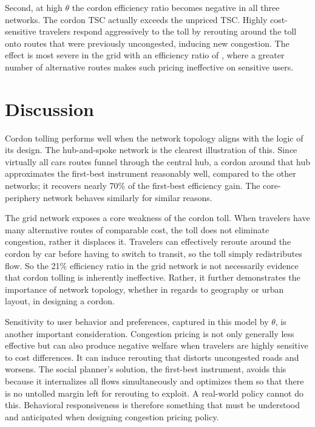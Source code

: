 \documentclass[12pt]{article}
\begin{document}
Second, at high $\theta$ the cordon efficiency ratio becomes negative in all three networks.
The cordon TSC actually exceeds the unpriced TSC.
Highly cost-sensitive travelers respond aggressively to the toll by rerouting around the toll onto routes that were previously uncongested, inducing new congestion.
The effect is most severe in the grid with an efficiency ratio of , where a greater number of alternative routes makes such pricing ineffective on sensitive users.

\begin{table}
    \centering
    \footnotesize
    
    \caption{Equilibrium mode shares under low and high $\theta$.}
    \label{tab:mode_shares_varying_theta}
\end{table}

\begin{table}
    \centering
    \footnotesize
    
    \caption{Total social cost under low and high $\theta$.}
    \label{tab:tsc_varying_theta}
\end{table}

\section{Discussion}

Cordon tolling performs well when the network topology aligns with the logic of its design.
The hub-and-spoke network is the clearest illustration of this.
Since virtually all cars routes funnel through the central hub, a cordon around that hub approximates the first-best instrument reasonably well, compared to the other networks; it recovers nearly 70\% of the first-best efficiency gain.
The core-periphery network behaves similarly for similar reasons.

The grid network exposes a core weakness of the cordon toll.
When travelers have many alternative routes of comparable cost, the toll does not eliminate congestion, rather it displaces it.
Travelers can effectively reroute around the cordon by car before having to switch to transit, so the toll simply redistributes flow.
So the 21\% efficiency ratio in the grid network is not necessarily evidence that cordon tolling is inherently ineffective.
Rather, it further demonstrates the importance of network topology, whether in regards to geography or urban layout, in designing a cordon.

Sensitivity to user behavior and preferences, captured in this model by $\theta$, is another important consideration.
Congestion pricing is not only generally less effective but can also produce negative welfare when travelers are highly sensitive to cost differences.
It can induce rerouting that distorts uncongested roads and worsens.
The social planner's solution, the first-best instrument, avoids this because it internalizes all flows simultaneously and optimizes them so that there is no untolled margin left for rerouting to exploit.
A real-world policy cannot do this.
Behavioral responsiveness is therefore something that must be understood and anticipated when designing congestion pricing policy.
\end{document}
